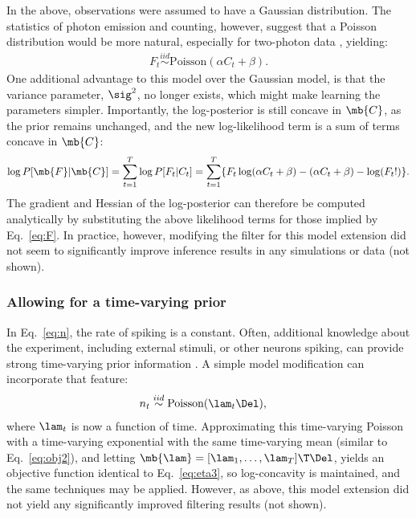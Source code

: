In the above, observations were assumed to have a Gaussian distribution.  The statistics of photon emission and counting, however, suggest that a Poisson distribution would be more natural, especially for two-photon data \cite{SjulsonMiesenbock07}, yielding:
\begin{align} \label{eq:poiss}
	F_t \overset{iid}{\sim}\text{Poisson}(\alpha C_t + \beta).
\end{align}
One additional advantage to this model over the Gaussian model, is that the variance parameter, $\sig^2$, no longer exists, which might make learning the parameters simpler.  Importantly, the log-posterior is still concave in $\mb{C}$, as
the prior remains unchanged, and the new log-likelihood term is a sum of terms concave in $\mb{C}$:
\begin{align}
	\log P[\mb{F} | \mb{C}] = \sum_{t=1}^T \log P[F_t | C_t ] = \sum_{t=1}^T \{F_t \log (\alpha C_t + \beta) -(\alpha C_t + \beta) - \log(F_t !)\}.
\end{align}
The gradient and Hessian of the log-posterior can therefore be computed analytically by substituting the above likelihood terms for those implied by Eq.~\eqref{eq:F}.  In practice, however, modifying the filter for this model extension did not seem to significantly improve inference results in any simulations or data (not shown).

\subsubsection{Allowing for a time-varying prior}

In Eq.~\eqref{eq:n}, the rate of spiking is a constant.  Often, additional knowledge about the experiment, including external stimuli, or other neurons spiking, can provide strong time-varying prior information \cite{VogelsteinPaninski09}.  A simple model modification can incorporate that feature:
\begin{align}
	n_t &\overset{iid}{\sim} \text{Poisson}(\lam_t \Del),
\end{align}
where $\lam_t$ is now a function of time.  Approximating this time-varying Poisson with a time-varying exponential with the same time-varying mean (similar to Eq.~\eqref{eq:obj2}), and letting $\mb{\lam} = [\lam_1, \ldots, \lam_T]\T \Del$, yields an objective function identical to Eq.~\eqref{eq:eta3}, so log-concavity is maintained, and the same techniques may be applied.  However, as above, this model extension did not yield any significantly improved filtering results (not shown).

